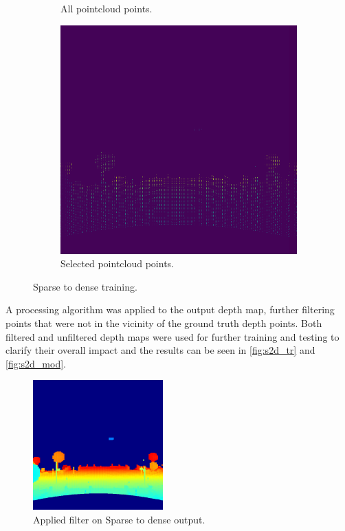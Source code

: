 \documentclass[twoside]{ctuthesis}
\theoremstyle{plain}
\theoremstyle{definition}
\theoremstyle{note}
\begin{document}
\begin{figure}
\begin{subfigure}[b]{0.4\textwidth}
		\caption{All pointcloud points.}
	\end{subfigure}
	\hfill
	\begin{subfigure}[b]{0.4\textwidth}
		\centering
		\includegraphics[width=\textwidth]{s2d_select.png}
		\caption{Selected pointcloud points.}
	\end{subfigure}
	\caption{Sparse to dense training.}
	\label{fig:s2d_tr}
\end{figure}
A processing algorithm was applied to the output depth map, further filtering points that were not in the vicinity of the ground truth depth points. Both filtered and unfiltered depth maps were used for further training and testing to clarify their overall impact and the results can be seen in \autoref{fig:s2d_tr} and \autoref{fig:s2d_mod}.
\begin{figure}
	\centering
	\includegraphics[width=5cm]{sparse2dense_filter.png}
	\caption{Applied filter on Sparse to dense output.}
	\label{fig:s2d_mod}
\end{figure}
\end{document}
